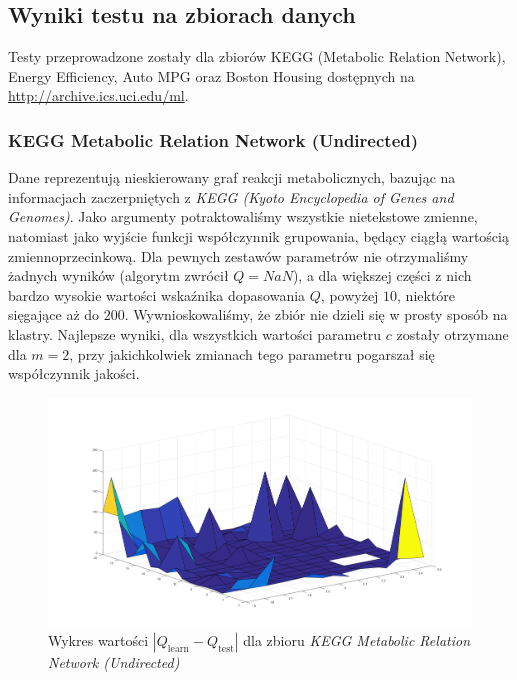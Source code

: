 \documentclass[a4paper; 11pt]{article}
\begin{document}
\subsection{Wyniki testu na zbiorach danych}

Testy przeprowadzone zostały dla zbiorów 
KEGG (Metabolic Relation Network),
Energy Efficiency,
Auto MPG oraz
Boston Housing
dostępnych na \url{http://archive.ics.uci.edu/ml}.


\subsubsection{KEGG Metabolic Relation Network (Undirected)}
Dane reprezentują nieskierowany graf reakcji metabolicznych, bazując na informacjach zaczerpniętych
z \emph{KEGG (Kyoto Encyclopedia of Genes and Genomes)}. Jako argumenty potraktowaliśmy wszystkie
nietekstowe zmienne, natomiast jako wyjście funkcji współczynnik grupowania, będący ciągłą
wartością zmiennoprzecinkową. Dla pewnych zestawów parametrów nie otrzymaliśmy żadnych wyników
(algorytm zwrócił $Q = NaN$), a dla większej części z nich bardzo wysokie wartości wskaźnika
dopasowania $Q$, powyżej $10$, niektóre sięgające aż do $200$. Wywnioskowaliśmy, że zbiór nie dzieli
się w prosty sposób na klastry. Najlepsze wyniki, dla wszystkich wartości parametru $c$ zostały otrzymane
dla $m = 2$, przy jakichkolwiek zmianach tego parametru pogarszał się współczynnik jakości.

\begin{figure}[h]
    \centering
    \includegraphics[scale=.3]{dq_kegg.png}
    \caption{Wykres wartości $\left| Q_\text{learn} - Q_\text{test} \right|$ dla zbioru 
        \emph{KEGG Metabolic Relation Network (Undirected)}}
    \label{fig:kegg}
\end{figure}
\end{document}

